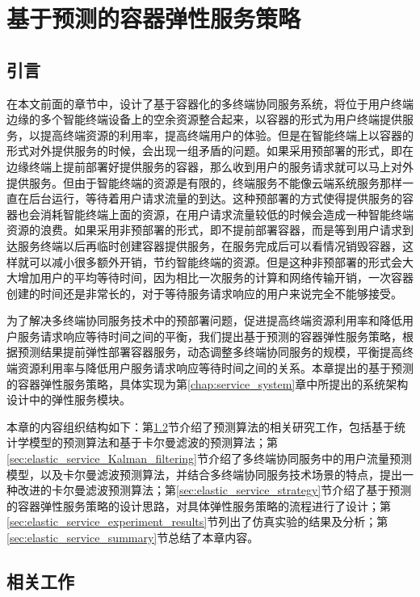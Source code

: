 \chapter{基于预测的容器弹性服务策略 }\label{chap:elastic_service}

\section{引言}

在本文前面的章节中，设计了基于容器化的多终端协同服务系统，将位于用户终端边缘的多个智能终端设备上的空余资源整合起来，以容器的形式为用户终端提供服务，以提高终端资源的利用率，提高终端用户的体验。但是在智能终端上以容器的形式对外提供服务的时候，会出现一组矛盾的问题。如果采用预部署的形式，即在边缘终端上提前部署好提供服务的容器，那么收到用户的服务请求就可以马上对外提供服务。但由于智能终端的资源是有限的，终端服务不能像云端系统服务那样一直在后台运行，等待着用户请求流量的到达。这种预部署的方式使得提供服务的容器也会消耗智能终端上面的资源，在用户请求流量较低的时候会造成一种智能终端资源的浪费。如果采用非预部署的形式，即不提前部署容器，而是等到用户请求到达服务终端以后再临时创建容器提供服务，在服务完成后可以看情况销毁容器，这样就可以减小很多额外开销，节约智能终端的资源。但是这种非预部署的形式会大大增加用户的平均等待时间，因为相比一次服务的计算和网络传输开销，一次容器创建的时间还是非常长的，对于等待服务请求响应的用户来说完全不能够接受。

为了解决多终端协同服务技术中的预部署问题，促进提高终端资源利用率和降低用户服务请求响应等待时间之间的平衡，我们提出基于预测的容器弹性服务策略，根据预测结果提前弹性部署容器服务，动态调整多终端协同服务的规模，平衡提高终端资源利用率与降低用户服务请求响应等待时间之间的关系。本章提出的基于预测的容器弹性服务策略，具体实现为第\ref{chap:service_system}章中所提出的系统架构设计中的弹性服务模块。

本章的内容组织结构如下：第\ref{sec:elastic_service_related_work}节介绍了预测算法的相关研究工作，包括基于统计学模型的预测算法和基于卡尔曼滤波的预测算法；第\ref{sec:elastic_service_Kalman_filtering}节介绍了多终端协同服务中的用户流量预测模型，以及卡尔曼滤波预测算法，并结合多终端协同服务技术场景的特点，提出一种改进的卡尔曼滤波预测算法；第\ref{sec:elastic_service_strategy}节介绍了基于预测的容器弹性服务策略的设计思路，对具体弹性服务策略的流程进行了设计；第\ref{sec:elastic_service_experiment_results}节列出了仿真实验的结果及分析；第\ref{sec:elastic_service_summary}节总结了本章内容。

\section{相关工作}\label{sec:elastic_service_related_work}


